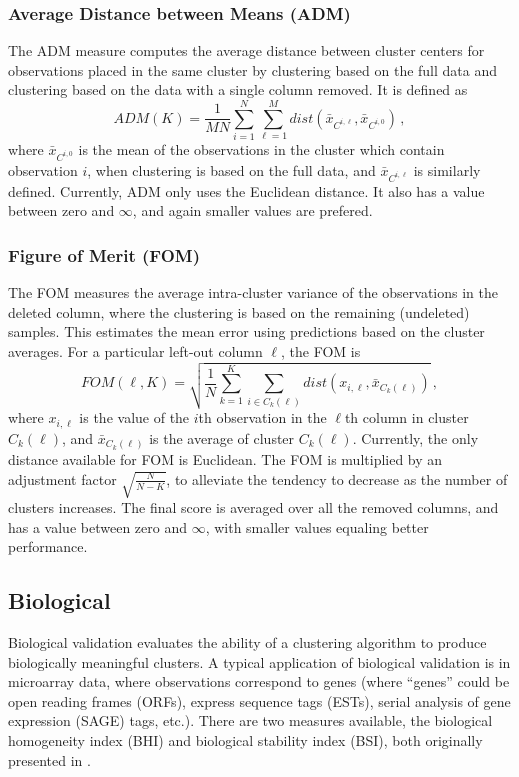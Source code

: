 \documentclass[11pt]{article}
\begin{document}
\subsubsection*{Average Distance between Means (ADM)}
The ADM measure computes  the average
distance between cluster centers for observations placed in the same cluster
by clustering based on the full data and clustering based
on the data with a single column removed.  
It is defined as 
$$
ADM(K) =  \frac{1}{MN}\sum\limits_{i=1}^N\sum\limits_{\ell=1}^M
dist(\bar{x}_{C^{i,\ell}}, \bar{x}_{C^{i,0}})\,,
$$
where $\bar{x}_{C^{i,0}}$ is the mean of the observations in the
cluster which contain observation $i$, when clustering is based on the
full data, and $\bar{x}_{C^{i,\ell}}$ is similarly defined.
Currently, ADM only uses the Euclidean distance. %
It also has a value between zero and $\infty$, and again smaller
values are prefered.

\subsubsection*{Figure of Merit (FOM)}

The FOM measures the average intra-cluster variance
of the observations in the deleted column, where the clustering is based on the remaining
(undeleted) samples.  This estimates the mean error using
predictions based on the cluster averages.
For a particular left-out column $\ell$, the FOM is 
$$
FOM(\ell, K) =  \sqrt{\frac{1}{N}\sum\limits_{k=1}^K\sum\limits_{i\in
    C_k(\ell)} dist(x_{i,\ell}, \bar{x}_{C_k(\ell)})}\,,
$$
where $x_{i,\ell}$ is the value of the $i$th observation in the
$\ell$th column in
cluster $C_k(\ell)$, and $\bar{x}_{C_k(\ell)}$ is the average of
cluster ${C_k(\ell)}$.
Currently, the only distance available for FOM is Euclidean.
The FOM is multiplied by an adjustment factor $\sqrt{\frac{N}{N-K}}$,
to alleviate the tendency to decrease as the number of clusters
increases.  The final score is averaged over all the removed columns,
and has a value between zero and $\infty$, with smaller values
equaling better performance. 



\subsection{Biological}
\label{subsec:biological}

Biological validation evaluates the ability of a clustering algorithm
to produce biologically meaningful clusters.  A typical application of
biological validation is in microarray data, where observations
correspond to genes (where ``genes'' could be open reading frames
(ORFs), express sequence tags (ESTs), serial analysis of gene
expression (SAGE) tags,
etc.).  There are two measures available, the biological homogeneity index (BHI) and
biological stability index (BSI), both originally presented in \citet{Dat2006}.  
\end{document}
